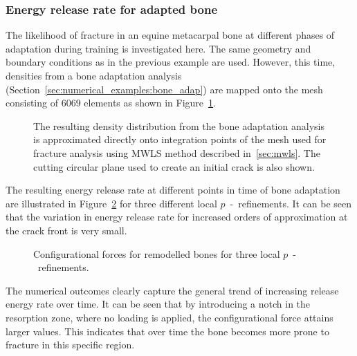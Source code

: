 \documentclass[review]{elsarticle}
\numberwithin{equation}{section}
\begin{document}
\subsubsection{Energy release rate for adapted bone}
The likelihood of fracture in an equine metacarpal bone at different phases of adaptation during training is investigated here.
The same geometry and boundary conditions as in the previous example are used. 
However, this time, densities from a bone adaptation analysis (Section~\ref{sec:numerical_examples:bone_adap}) are mapped onto the mesh consisting of 6069 elements as shown in Figure~\ref{fig:frackmeshcutting}. 
\begin{figure}[h]
	\centering
			\def\svgwidth{12cm}
		
	\caption{The resulting density distribution from the bone adaptation analysis is approximated directly onto integration points of the mesh used for fracture analysis using MWLS method described in~\ref{sec:mwls}. The cutting circular plane used to create an initial crack is also shown.}
	\label{fig:frackmeshcutting}
\end{figure}
The resulting energy release rate at different points in time of bone adaptation are illustrated in Figure~\ref{fig:crackmc3release} for three different local $p$~-~refinements. It can be seen that the variation in energy release rate for increased orders of approximation at the crack front is very small. 
\begin{figure}[h!]
	\centering
	\caption{Configurational forces for remodelled bones for three local $p$~-~refinements.}
	\label{fig:crackmc3release}
\end{figure}
The numerical outcomes clearly capture the general trend of increasing release energy rate over time. It can be seen that by introducing a notch in the resorption zone, where no loading is applied, the configurational force attains larger values. This indicates that over time the bone becomes more prone to fracture in this specific region. 
\end{document}
